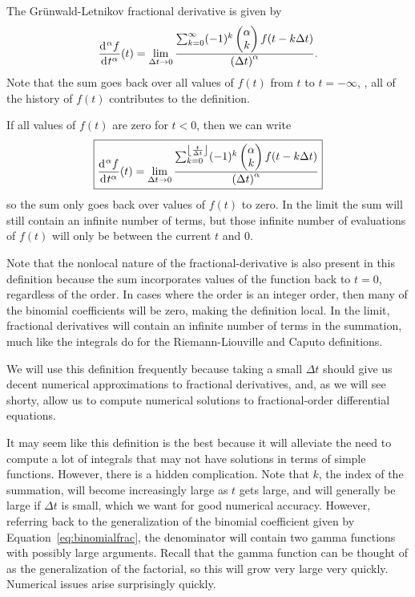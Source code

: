     \begin{definition}
      The Gr\"unwald-Letnikov fractional derivative is given by
      \begin{equation}
	\frac{\operatorname{d}\hspace*{-1pt}^\alpha f}{\operatorname{d}\hspace*{-1pt} t^\alpha} (t) = \lim_{\Delta t \rightarrow 0} \frac{ \sum_{k=0}^{\infty} (-1)^k \begin{pmatrix} \alpha \\ k \end{pmatrix} f(t - k \Delta t) }{\left( \Delta t \right)^\alpha}.
	\label{eq:gwdef1}
      \end{equation}
      Note that the sum goes back over all values of $f(t)$ from $t$ to $t = -\infty$, \ie, all of the history of $f(t)$ contributes to the definition. 

      If all values of $f(t)$ are zero for $t < 0$, then we can write
      \begin{equation}
	\boxed{	\frac{\operatorname{d}\hspace*{-1pt}^\alpha f}{\operatorname{d}\hspace*{-1pt} t^\alpha} (t) = \lim_{\Delta t \rightarrow 0} \frac{ \sum_{k=0}^{\left\lfloor \frac{t}{\Delta t} \right\rfloor} (-1)^k \begin{pmatrix} \alpha \\ k \end{pmatrix} f(t - k \Delta t) }{\left( \Delta t \right)^\alpha} }
	\label{eq:gwdef2}
      \end{equation}
      so the sum only goes back over values of $f(t)$ to zero. In the limit the sum will still contain an infinite number of terms, but those infinite number of evaluations of $f(t)$ will only be between the current $t$ and $0$.
      \label{def:gw}
    \end{definition}

    Note that the nonlocal nature of the fractional-derivative is also present in this definition because the sum incorporates values of the function back to $t=0$, regardless of the order. In cases where the order is an integer order, then many of the binomial coefficients will be zero, making the definition local. In the limit, fractional derivatives will contain an infinite number of terms in the summation, much like the integrals do for the Riemann-Liouville and Caputo definitions. 

    We will use this definition frequently because taking a small $\Delta t$ should give us decent numerical approximations to fractional derivatives, and, as we will see shorty, allow us to compute numerical solutions to fractional-order differential equations.

    It may seem like this definition is the best because it will alleviate the need to compute a lot of integrals that may not have solutions in terms of simple functions. However, there is a hidden complication. Note that $k$, the index of the summation, will become increasingly large as $t$ gets large, and will generally be large if $\Delta t$ is small, which we want for good numerical accuracy. However, referring back to the generalization of the binomial coefficient given by Equation~\ref{eq:binomialfrac}, the denominator will contain two gamma functions with possibly large arguments. Recall that the gamma function can be thought of as the generalization of the factorial, so this will grow very large very quickly. Numerical issues arise surprisingly quickly.

